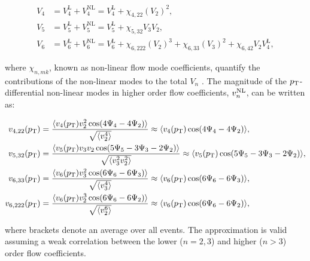 \documentclass[ALICE,manyauthors]{cernphprep}
\begin{document}
\vspace{-0.55cm}
\begin{align}
V_{4} &= V_{4}^{\mathrm{L}} + V_{4}^{\mathrm{NL}} = V_{4}^{\mathrm{L}} + \chi_{4,22}(V_{2})^2, \nonumber \\
V_{5} &= V_{5}^{\mathrm{L}} + V_{5}^{\mathrm{NL}} = V_{5}^{\mathrm{L}} + \chi_{5,32}V_{3}V_{2}, \nonumber \\
V_{6} &= V_{6}^{\mathrm{L}} + V_{6}^{\mathrm{NL}} = V_{6}^{\mathrm{L}} + \chi_{6,222}(V_{2})^3 + \chi_{6,33}(V_{3})^2 + \chi_{6,42}V_{2}V_{4}^{\mathrm{L}},
\label{Eq:V4V5V6}
\end{align}
\vspace{-0.55cm}

where $\chi_{n,mk}$, known as non-linear flow mode coefficients, quantify the contributions of the non-linear modes to the total $V_{n}$ \cite{Yan:2015jma, Acharya:2017zfg}. The magnitude of the $p_{\rm{T}}$-differential non-linear modes in higher order flow coefficients, $v_{n}^{\rm{NL}}$, can be written as: 

\begin{align}
v_{4,22}(p_{\rm{T}})&= \frac{\langle v_{4}(p_{\rm{T}})v_{2}^{2}\cos(4\Psi_{4}-4\Psi_{2})\rangle}{\sqrt{\langle v_{2}^{4}\rangle}} \approx \langle v_{4}(p_{\rm{T}})\cos(4\Psi_{4}-4\Psi_{2})\rangle, \label{Eq:V422}\\
v_{5,32}(p_{\rm{T}})&= \frac{\langle v_{5}(p_{\rm{T}})v_{3}v_{2}\cos(5\Psi_{5}-3\Psi_{3}-2\Psi_{2})\rangle}{\sqrt{\langle v_{3}^{2}v_{2}^{2}\rangle}} \approx \langle v_{5}(p_{\rm{T}})\cos(5\Psi_{5}-3\Psi_{3}-2\Psi_{2})\rangle, \label{Eq:V532}\\
v_{6,33}(p_{\rm{T}}) &= \frac{\langle v_{6}(p_{\rm{T}})v_{3}^{2}\cos(6\Psi_{6}-6\Psi_{3})\rangle}{\sqrt{\langle v_{3}^{4}\rangle}} \approx \langle v_{6}(p_{\rm{T}})\cos(6\Psi_{6}-6\Psi_{3})\rangle , \label{Eq:V633}\\
v_{6,222}(p_{\rm{T}}) &= \frac{\langle v_{6}(p_{\rm{T}})v_{2}^{3}\cos(6\Psi_{6}-6\Psi_{2})\rangle}{\sqrt{\langle v_{2}^{6}\rangle}} \approx \langle v_{6}(p_{\rm{T}})\cos(6\Psi_{6}-6\Psi_{2})\rangle,
\label{Eq:V6222}
\end{align}

\noindent where brackets denote an average over all events. The approximation is valid assuming a weak correlation between the lower ($n=2,3$) and higher ($n>3$) order flow coefficients.
\end{document}
